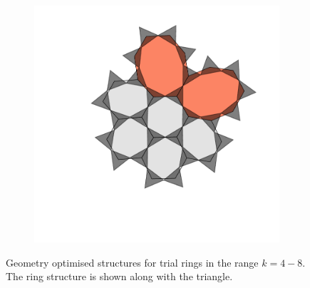\begin{figure}[bt]
\begin{subfigure}[b]{0.18\textwidth}
         \caption{}
         \label{fig:triraftalgtrial4}
     \end{subfigure}
     \hfill
      \begin{subfigure}[b]{0.18\textwidth}
         \centering
         \includegraphics[width=\textwidth]{./figures/bilayers/alg_8.pdf}
         \caption{}
         \label{fig:triraftalgtrial5}
     \end{subfigure}
     \hfill
     \caption{Geometry optimised structures for trial rings in the range $k = 4-8$. The ring structure is shown along with the \sioiii{} triangle.}
     \label{fig:triraftalgtrial}
    
\end{figure}

